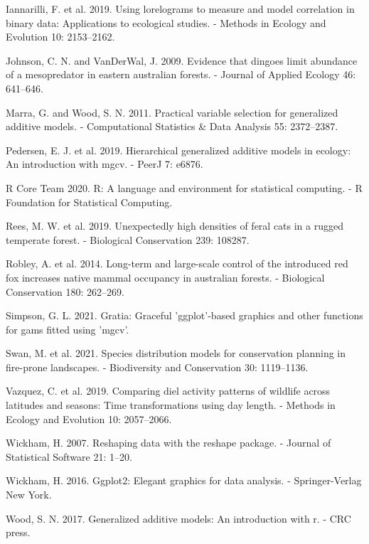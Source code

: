 \documentclass[]{elsarticle} %
\begin{document}
\leavevmode\hypertarget{ref-https:ux2fux2fdoi.orgux2f10.1111ux2f2041-210X.13308}{}%
Iannarilli, F. et al. 2019. Using lorelograms to measure and model correlation in binary data: Applications to ecological studies. - Methods in Ecology and Evolution 10: 2153--2162.

\leavevmode\hypertarget{ref-https:ux2fux2fdoi.orgux2f10.1111ux2fj.1365-2664.2009.01650.x}{}%
Johnson, C. N. and VanDerWal, J. 2009. Evidence that dingoes limit abundance of a mesopredator in eastern australian forests. - Journal of Applied Ecology 46: 641--646.

\leavevmode\hypertarget{ref-MARRA20112372}{}%
Marra, G. and Wood, S. N. 2011. Practical variable selection for generalized additive models. - Computational Statistics \& Data Analysis 55: 2372--2387.

\leavevmode\hypertarget{ref-pedersen2019hierarchical}{}%
Pedersen, E. J. et al. 2019. Hierarchical generalized additive models in ecology: An introduction with mgcv. - PeerJ 7: e6876.

\leavevmode\hypertarget{ref-R}{}%
R Core Team 2020. R: A language and environment for statistical computing. - R Foundation for Statistical Computing.

\leavevmode\hypertarget{ref-REES2019108287}{}%
Rees, M. W. et al. 2019. Unexpectedly high densities of feral cats in a rugged temperate forest. - Biological Conservation 239: 108287.

\leavevmode\hypertarget{ref-ROBLEY2014262}{}%
Robley, A. et al. 2014. Long-term and large-scale control of the introduced red fox increases native mammal occupancy in australian forests. - Biological Conservation 180: 262--269.

\leavevmode\hypertarget{ref-gratia}{}%
Simpson, G. L. 2021. Gratia: Graceful 'ggplot'-based graphics and other functions for gams fitted using 'mgcv'.

\leavevmode\hypertarget{ref-swan2021species}{}%
Swan, M. et al. 2021. Species distribution models for conservation planning in fire-prone landscapes. - Biodiversity and Conservation 30: 1119--1136.

\leavevmode\hypertarget{ref-https:ux2fux2fdoi.orgux2f10.1111ux2f2041-210X.13290}{}%
Vazquez, C. et al. 2019. Comparing diel activity patterns of wildlife across latitudes and seasons: Time transformations using day length. - Methods in Ecology and Evolution 10: 2057--2066.

\leavevmode\hypertarget{ref-reshape}{}%
Wickham, H. 2007. Reshaping data with the reshape package. - Journal of Statistical Software 21: 1--20.

\leavevmode\hypertarget{ref-ggplot2}{}%
Wickham, H. 2016. Ggplot2: Elegant graphics for data analysis. - Springer-Verlag New York.

\leavevmode\hypertarget{ref-wood2017}{}%
Wood, S. N. 2017. Generalized additive models: An introduction with r. - CRC press.
\end{document}
